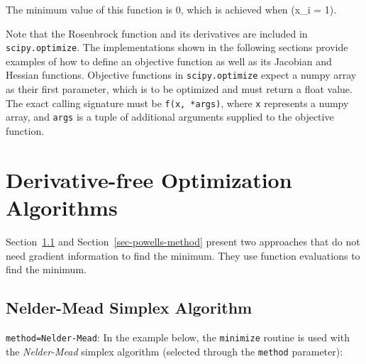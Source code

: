 \documentclass[
  letterpaper,
  DIV=11,
  numbers=noendperiod]{scrreprt}
\begin{document}
The minimum value of this function is 0, which is achieved when (x\_i =
1).

Note that the Rosenbrock function and its derivatives are included in
\texttt{scipy.optimize}. The implementations shown in the following
sections provide examples of how to define an objective function as well
as its Jacobian and Hessian functions. Objective functions in
\texttt{scipy.optimize} expect a numpy array as their first parameter,
which is to be optimized and must return a float value. The exact
calling signature must be \texttt{f(x,\ *args)}, where \texttt{x}
represents a numpy array, and \texttt{args} is a tuple of additional
arguments supplied to the objective function.

\section{Derivative-free Optimization
Algorithms}\label{derivative-free-optimization-algorithms}

Section~\ref{sec-nelder-mead-simplex-algorithm} and
Section~\ref{sec-powells-method} present two approaches that do not need
gradient information to find the minimum. They use function evaluations
to find the minimum.

\subsection{Nelder-Mead Simplex
Algorithm}\label{sec-nelder-mead-simplex-algorithm}

\texttt{method=\textquotesingle{}Nelder-Mead\textquotesingle{}}: In the
example below, the \texttt{minimize} routine is used with the
\emph{Nelder-Mead} simplex algorithm (selected through the
\texttt{method} parameter):
\end{document}

